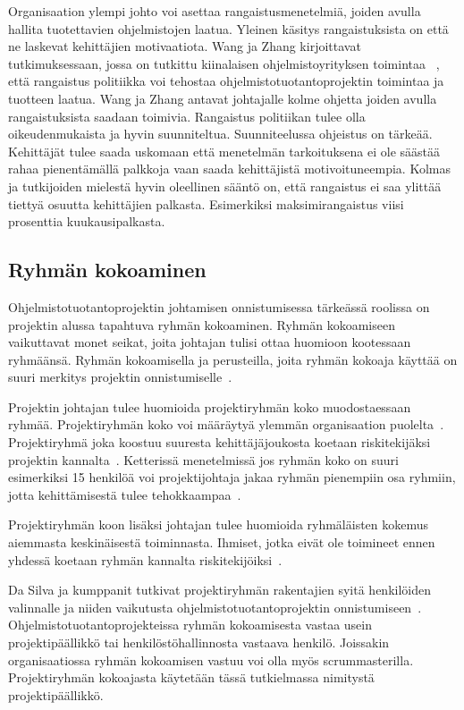 \documentclass[finnish]{tktltiki2}
\theoremstyle{definition}
\theoremstyle{remark}
\begin{document}
Organisaation ylempi johto voi asettaa rangaistusmenetelmiä, joiden avulla hallita tuotettavien ohjelmistojen laatua. Yleinen käsitys rangaistuksista on että ne laskevat kehittäjien motivaatiota. Wang ja Zhang kirjoittavat tutkimuksessaan, jossa on tutkittu kiinalaisen ohjelmistoyrityksen toimintaa ~\cite{Wang:2010:PPP:1810295.1810302}, että rangaistus politiikka voi tehostaa ohjelmistotuotantoprojektin toimintaa ja tuotteen laatua. Wang ja Zhang antavat johtajalle kolme ohjetta joiden avulla rangaistuksista saadaan toimivia. Rangaistus politiikan tulee olla oikeudenmukaista ja hyvin suunniteltua. Suunniteelussa ohjeistus on tärkeää. Kehittäjät tulee saada uskomaan että menetelmän tarkoituksena ei ole säästää rahaa pienentämällä palkkoja vaan saada kehittäjistä motivoituneempia. Kolmas ja tutkijoiden mielestä hyvin oleellinen sääntö on, että rangaistus ei saa ylittää tiettyä osuutta kehittäjien palkasta. Esimerkiksi maksimirangaistus viisi prosenttia kuukausipalkasta.



\subsection{Ryhmän kokoaminen}


Ohjelmistotuotantoprojektin johtamisen onnistumisessa tärkeässä roolissa on projektin alussa tapahtuva ryhmän kokoaminen. Ryhmän kokoamiseen vaikuttavat monet seikat, joita johtajan tulisi ottaa huomioon kootessaan ryhmäänsä. Ryhmän kokoamisella ja perusteilla, joita ryhmän kokoaja käyttää on suuri merkitys projektin onnistumiselle~\cite{daSilva2012}.

Projektin johtajan tulee huomioida projektiryhmän koko muodostaessaan ryhmää. Projektiryhmän koko voi määräytyä ylemmän organisaation puolelta~\cite{McLeod:2011:FAS:1978802.1978803}. Projektiryhmä joka koostuu suuresta kehittäjäjoukosta koetaan riskitekijäksi projektin kannalta~\cite{McLeod:2011:FAS:1978802.1978803}. Ketterissä menetelmissä jos ryhmän koko on suuri esimerkiksi 15 henkilöä voi projektijohtaja jakaa ryhmän pienempiin osa ryhmiin, jotta kehittämisestä tulee tehokkaampaa~\cite{Augustine:2005:APM:1101779.1101781}.

Projektiryhmän koon lisäksi johtajan tulee huomioida ryhmäläisten kokemus aiemmasta keskinäisestä toiminnasta. Ihmiset, jotka eivät ole toimineet ennen yhdessä koetaan ryhmän kannalta riskitekijöiksi~\cite{McLeod:2011:FAS:1978802.1978803}. 


Da Silva ja kumppanit tutkivat projektiryhmän rakentajien syitä henkilöiden valinnalle ja niiden vaikutusta ohjelmistotuotantoprojektin onnistumiseen~\cite{daSilva2012, francca2009quantitative}. Ohjelmistotuotantoprojekteissa ryhmän kokoamisesta vastaa usein projektipäällikkö tai henkilöstöhallinnosta vastaava henkilö. Joissakin organisaatiossa ryhmän kokoamisen vastuu voi olla myös scrummasterilla. Projektiryhmän kokoajasta käytetään tässä tutkielmassa nimitystä projektipäällikkö.
\end{document}
